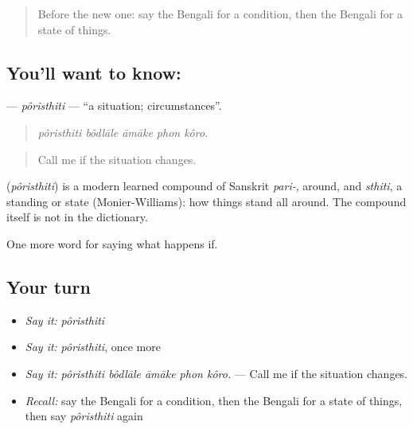 \label{lesson:BN-C368-poristhiti}



\begin{quote}
Before the new one: say the Bengali for a condition, then the Bengali for a state of things.
\end{quote}

\subsection*{You'll want to know: }
\textbf{} — \emph{pôristhiti} — \textquotedblleft{}a situation; circumstances\textquotedblright{}.

\begin{quote}
    
\end{quote}

\begin{quote}
\emph{pôristhiti bôdlāle āmāke phon kôro.}
\end{quote}

\begin{quote}
Call me if the situation changes.
\end{quote}

\begin{cousinweb}
\textbf{} (\emph{pôristhiti}) is a modern learned compound of Sanskrit \emph{pari-}, around, and \emph{sthiti}, a standing or state (Monier-Williams): how things stand all around. The compound itself is not in the dictionary.
\end{cousinweb}

\begin{grammarlens}[title={What you've built}]
One more word for saying what happens if.
\end{grammarlens}

\subsection*{Your turn}
\begin{itemize}
\raggedright
  \item \emph{Say it:} \emph{pôristhiti}
  \item \emph{Say it:} \emph{pôristhiti}, once more
  \item \emph{Say it:} \emph{pôristhiti bôdlāle āmāke phon kôro.} — Call me if the situation changes.
  \item \emph{Recall:} say the Bengali for a condition, then the Bengali for a state of things, then say \emph{pôristhiti} again
\end{itemize}

